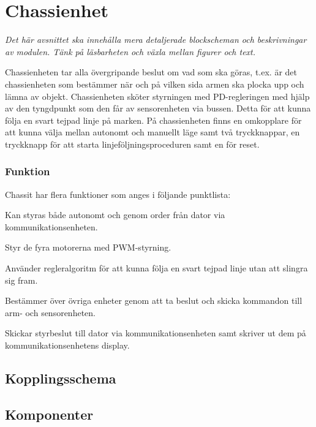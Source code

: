\section{Chassienhet}
\emph{Det här avsnittet ska innehålla mera detaljerade blockscheman och beskrivningar av modulen.
Tänk på läsbarheten och växla mellan figurer och text.}

Chassienheten tar alla övergripande beslut om vad som ska göras, t.ex. är det chassienheten som bestämmer när och på vilken sida armen ska plocka upp och lämna av objekt. Chassienheten sköter styrningen med PD-regleringen med hjälp av den tyngdpunkt som den får av sensorenheten via bussen. Detta för att kunna följa en svart tejpad linje på marken. På chassienheten finns en omkopplare för att kunna välja mellan autonomt och manuellt läge samt två tryckknappar, en tryckknapp för att starta linjeföljningsproceduren samt en för reset. 

\subsubsection{Funktion}

Chassit har flera funktioner som anges i följande punktlista:
\begin{packed_itemize}
\item Kan styras både autonomt och genom order från dator via kommunikationsenheten.
\item Styr de fyra motorerna med PWM-styrning.
\item Använder regleralgoritm för att kunna följa en svart tejpad linje utan att slingra sig fram.
\item Bestämmer över övriga enheter genom att ta beslut och skicka kommandon till arm- och sensorenheten.
\item Skickar styrbeslut till dator via kommunikationsenheten samt skriver ut dem på kommunikationsenhetens display.
\end{packed_itemize}

\subsection{Kopplingsschema}


\subsection{Komponenter}

